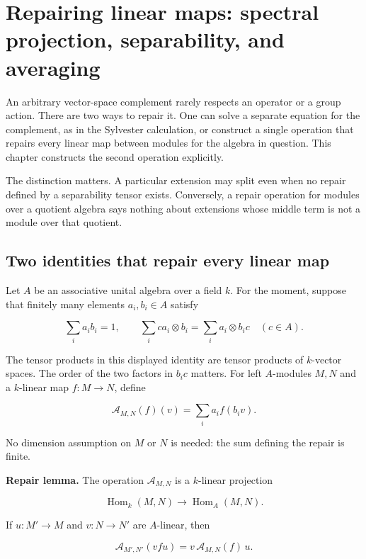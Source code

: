 \documentclass[
  11pt,
]{article}
\begin{document}
\section{Repairing linear maps: spectral projection, separability, and
averaging}\label{repairing-linear-maps-spectral-projection-separability-and-averaging}

An arbitrary vector-space complement rarely respects an operator or a
group action. There are two ways to repair it. One can solve a separate
equation for the complement, as in the Sylvester calculation, or
construct a single operation that repairs every linear map between
modules for the algebra in question. This chapter constructs the second
operation explicitly.

The distinction matters. A particular extension may split even when no
repair defined by a separability tensor exists. Conversely, a repair
operation for modules over a quotient algebra says nothing about
extensions whose middle term is not a module over that quotient.

\subsection{Two identities that repair every linear
map}\label{two-identities-that-repair-every-linear-map}

Let \(A\) be an associative unital algebra over a field \(k\). For the
moment, suppose that finitely many elements \(a_i,b_i\in A\) satisfy

\[
\sum_i a_i b_i=1,\qquad
\sum_i c a_i\otimes b_i=\sum_i a_i\otimes b_i c
\quad(c\in A).                                      \tag{A1}
\]

The tensor products in this displayed identity are tensor products of
\(k\)-vector spaces. The order of the two factors in \(b_i c\) matters.
For left \(A\)-modules \(M,N\) and a \(k\)-linear map \(f:M\to N\),
define

\[
\mathcal A_{M,N}(f)(v)=\sum_i a_i f(b_i v).            \tag{A2}
\]

No dimension assumption on \(M\) or \(N\) is needed: the sum defining
the repair is finite.

\textbf{Repair lemma.} The operation \(\mathcal A_{M,N}\) is a
\(k\)-linear projection

\[
\operatorname{Hom}_k(M,N)\longrightarrow
\operatorname{Hom}_A(M,N).
\]

If \(u:M'\to M\) and \(v:N\to N'\) are \(A\)-linear, then

\[
\mathcal A_{M',N'}(vfu)=v\,\mathcal A_{M,N}(f)\,u.    \tag{A3}
\]
\end{document}
